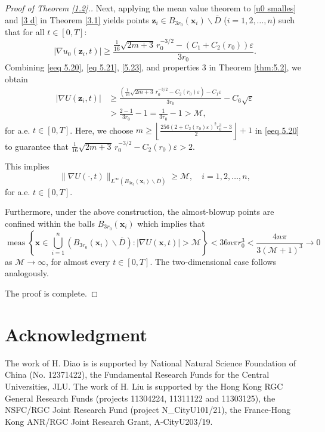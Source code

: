 \documentclass[11pt,reqno,oneside]{amsart}
\numberwithin{equation}{section}
\theoremstyle{definition}
\theoremstyle{remark}
\numberwithin{equation}{section}
\begin{document}
\begin{proof}[Proof of Theorem \ref{1.2}.]
	Next, applying the mean value theorem to \eqref{u0 smalles} and \eqref{3 d} in Theorem \ref{3.1} yields points $\mathbf{z}_i \in B_{3r_0}(\mathbf{x}_i) \backslash \overline{D}$ ($i=1,2,\dots,n$) such that for all $t \in [0,T]$:
	\begin{equation}\label{5.23}
		|\nabla u_0(\mathbf{z}_i,t)| \geqslant \frac{
			\tfrac{1}{16}\sqrt{2m+3} \, r_0^{-3/2} - \left(C_1 + C_2(r_0)\right)\varepsilon
		}{3r_0}.
	\end{equation}
	Combining \eqref{eeq 5.20}, \eqref{eq 5.21}, \eqref{5.23}, and properties 3 in Theorem \ref{thm:5.2}, we obtain
	\begin{equation*}
		\begin{aligned}
			|\nabla U(\mathbf{z}_i,t)| &\geqslant \frac{\left(
				\tfrac{1}{16}\sqrt{2m+3} \, r_0^{-3/2} -C_2(r_0)\varepsilon\right)-  C_1\varepsilon
			}{3r_0} - C_6\sqrt{\varepsilon} \\
			& > \frac{2 - 1}{3r_0} - 1 = \frac{1}{3r_0} - 1 > \mathcal{M},
		\end{aligned}
	\end{equation*}
	for a.e. $t \in [0,T]$. Here, we choose $m \geqslant \left\lfloor \frac{256(2 + C_2(r_0)\varepsilon)^2 r_{0}^{3} - 3}{2} \right\rfloor +1$ in \eqref{eeq 5.20} to guarantee that  $	\tfrac{1}{16}\sqrt{2m+3} \, r_0^{-3/2} -C_2(r_0)\varepsilon>2 $. 
	
	This implies
	\begin{equation*}
		\|\nabla U(\cdot,t)\|_{L^{\infty} (B_{3r_0}(\mathbf{x}_i) \backslash \overline{D})} \geq \mathcal{M}, \quad i=1,2,\dots,n,
	\end{equation*}
	for a.e. $t\in [0,T]$.
	
	Furthermore, under the above construction, the almost-blowup points are confined within the balls $B_{3r_0}(\mathbf{x}_i)$ which implies that 
	\begin{equation*}
		\operatorname{meas}\left\{ \mathbf{x} \in \bigcup_{i=1}^{n} \left(B_{3r_0}(\mathbf{x}_i)\backslash \overline{D}\right) : |\nabla U(\mathbf{x},t)| > \mathcal{M} \right\} < 36n\pi r_0^3 < \frac{4n\pi}{3(\mathcal{M} + 1)^3}  \to 0
	\end{equation*}
	as $\mathcal{M} \to \infty$, for almost every $t \in [0,T]$. The two-dimensional case follows analogously.
	
	The proof is complete.
\end{proof}
	
	
	
	\section*{Acknowledgment}
	The work of H. Diao is is supported by National Natural Science Foundation of China  (No. 12371422), the Fundamental Research Funds for the Central Universities, JLU.   The work of H. Liu is supported by the Hong Kong RGC General Research Funds (projects 11304224, 11311122 and 11303125),  the NSFC/RGC Joint Research Fund (project N\_CityU101/21), the France-Hong Kong ANR/RGC Joint Research Grant, A-CityU203/19.
	
\end{document}
